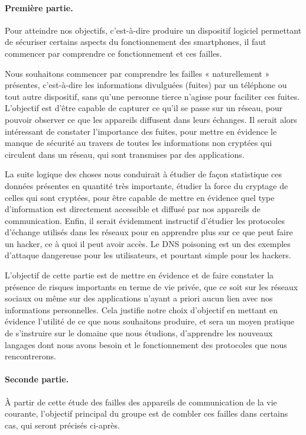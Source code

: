 \documentclass[a4paper, 12pt,twoside]{article}
\begin{document}
		\paragraph{Première partie. } Pour atteindre nos objectifs, c'est-à-dire produire un dispositif logiciel permettant de sécuriser certains aspects du fonctionnement des smartphones, il faut commencer par comprendre ce fonctionnement et ces failles.
		
		Nous souhaitons commencer par comprendre les failles «  naturellement  » présentes, c'est-à-dire les informations divulguées (fuites) par un téléphone ou tout autre dispositif, sans qu'une personne tierce n'agisse pour faciliter ces fuites. L'objectif est d'être capable de capturer ce qu'il se passe sur un réseau, pour pouvoir observer ce que les appareils diffusent dans leurs échanges. Il serait alors intéressant de constater l'importance des fuites, pour mettre en évidence le manque de sécurité au travers de toutes les informations non cryptées qui circulent dans un réseau, qui sont transmises par des applications.
		
		La suite logique des choses nous conduirait à étudier de façon statistique ces données présentes en quantité très importante, étudier la force du cryptage de celles qui sont cryptées, pour être capable de mettre en évidence quel type d'information est directement accessible et diffusé par nos appareils de communication. Enfin,  il serait évidemment instructif d'étudier les protocoles d'échange utilisés dans les réseaux pour en apprendre plus sur ce que peut faire un hacker, ce à quoi il peut avoir accès. Le DNS poisoning est un des exemples d'attaque dangereuse pour les utilisateurs, et pourtant simple pour les hackers.
		
		L'objectif de cette partie est de mettre en évidence et de faire constater la présence de risques importants en terme de vie privée, que ce soit sur les réseaux sociaux ou même sur des applications n'ayant a priori aucun lien avec nos informations personnelles. Cela justifie notre choix d'objectif en mettant en évidence l'utilité de ce que nous souhaitons produire, et sera un moyen pratique de s'instruire sur le domaine que nous étudions, d'apprendre les nouveaux langages dont nous avons besoin et le fonctionnement des protocoles que nous rencontrerons.
		
		\paragraph{Seconde partie. } À partir de cette étude des failles des appareils de communication de la vie courante, l'objectif principal du groupe est de combler ces failles dans certains cas, qui seront précisés ci-après.
		
\end{document}
